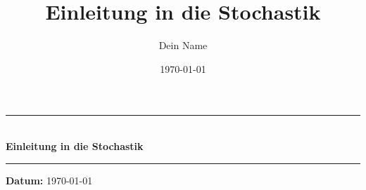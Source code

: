 \documentclass{article}
\title{\huge Einleitung in die Stochastik}
\author{Dein Name}
\date{\today}
\begin{document}
\begin{titlepage}
    \begin{center}
        \vspace*{2cm}
        
        
        
        
        
        \rule{\textwidth}{0.4pt} \\
        \vspace{0.5cm}
        {\huge \textbf{Einleitung in die Stochastik}} \\
        \vspace{0.5cm}
        \rule{\textwidth}{0.4pt}
        
        \vspace{3cm}
        
        
        
        
        \vfill
        
        {\large \textbf{Datum:} \today}
        
    \end{center}
\end{titlepage}



\pagestyle{fancy}
\fancyhf{}
\renewcommand{\headrulewidth}{1pt}
\lfoot{}
\rfoot{\thepage}
\end{document}
